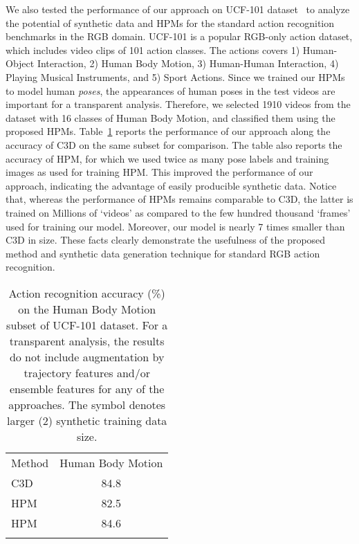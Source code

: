 \documentclass[twocolumn]{svjour3}          \smartqed  \usepackage{graphicx}
\begin{document}
We also tested the  performance of our approach on UCF-101 dataset~\citep{soomro2012ucf101} to analyze the potential of synthetic data and HPMs for the standard action recognition benchmarks in the RGB domain. UCF-101 is a popular RGB-only action dataset, which includes video clips of 101 action classes. The actions covers 1) Human-Object Interaction, 2) Human Body Motion, 3) Human-Human Interaction, 4) Playing Musical Instruments, and 5) Sport Actions. Since we trained our HPMs to model human \emph{poses}, the appearances of human poses in the test videos are important for a transparent analysis.  Therefore, we selected 1910 videos from the dataset with 16 classes of Human Body Motion, and classified them  using the proposed HPMs.
Table~\ref{tab:ucf101_compare} reports the performance of our approach along the accuracy  of C3D on the same subset for comparison. The table also reports the accuracy of HPM, for which we used twice as many pose labels and training images as used for training HPM.  
 This improved the performance of  our approach, indicating the advantage of easily producible synthetic data. Notice that, whereas  the performance of HPMs remains comparable to C3D, the latter is trained on Millions of `videos' as compared to the few hundred thousand `frames' used for training our model.  Moreover, our model is nearly 7 times smaller than C3D   in size.  These facts clearly demonstrate the usefulness of the proposed method and synthetic data generation technique for standard RGB action recognition.


\begin{table}[t]
\centering
\caption{Action recognition accuracy (\%) on the Human Body Motion subset of  UCF-101 dataset. For a transparent analysis, the results do not include augmentation by trajectory features and/or ensemble features for any of the approaches. The symbol  denotes larger (2) synthetic training data size. }
\label{tab:ucf101_compare}
\begin{tabular}{lc}
\hline\noalign{\smallskip}
Method & \multicolumn{1}{l}{Human Body Motion} \\ \noalign{\smallskip}\hline\noalign{\smallskip}

C3D & 84.8 \\ HPM & 82.5 \\ HPM & 84.6 \\ 

\hline\noalign{\smallskip}
\end{tabular}
\end{table}
\end{document}

